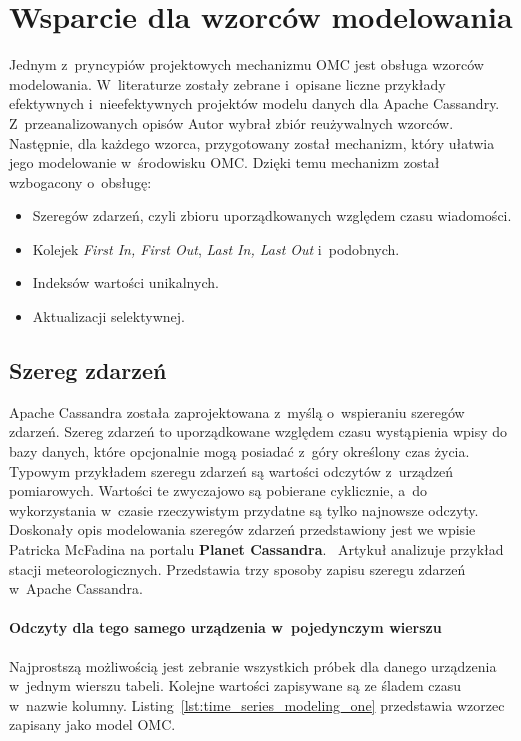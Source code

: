 \section{Wsparcie dla wzorców modelowania}

Jednym z~pryncypiów projektowych mechanizmu OMC jest obsługa wzorców modelowania. W~literaturze zostały zebrane i~opisane liczne przykłady efektywnych i~nieefektywnych projektów modelu danych dla Apache Cassandry. Z~przeanalizowanych opisów Autor wybrał zbiór reużywalnych wzorców. Następnie, dla każdego wzorca, przygotowany został mechanizm, który ułatwia jego modelowanie w~środowisku OMC. Dzięki temu mechanizm został wzbogacony o~obsługę:

\begin{itemize}
	\item Szeregów zdarzeń, czyli zbioru uporządkowanych względem czasu wiadomości.
	\item Kolejek \emph{First In, First Out}, \emph{Last In, Last Out} i~podobnych.
	\item Indeksów wartości unikalnych. 
	\item Aktualizacji selektywnej.
\end{itemize}

\subsection{Szereg zdarzeń}

Apache Cassandra została zaprojektowana z~myślą o~wspieraniu szeregów zdarzeń. Szereg zdarzeń to uporządkowane względem czasu wystąpienia wpisy do bazy danych, które opcjonalnie mogą posiadać z~góry określony czas życia. Typowym przykładem szeregu zdarzeń są wartości odczytów z~urządzeń pomiarowych. Wartości te zwyczajowo są pobierane cyklicznie, a~do wykorzystania w~czasie rzeczywistym przydatne są tylko najnowsze odczyty. Doskonały opis modelowania szeregów zdarzeń przedstawiony jest we wpisie Patricka McFadina na portalu \textbf{Planet Cassandra}.~\cite{time_series_modeling_pattern} Artykuł analizuje przykład stacji meteorologicznych. Przedstawia trzy sposoby zapisu szeregu zdarzeń w~Apache Cassandra. 

\paragraph{Odczyty dla tego samego urządzenia w~pojedynczym wierszu} 

Najprostszą możliwością jest zebranie wszystkich próbek dla danego urządzenia w~jednym wierszu tabeli. Kolejne wartości zapisywane są ze śladem czasu w~nazwie kolumny. Listing~\ref{lst:time_series_modeling_one} przedstawia wzorzec zapisany jako model OMC.

